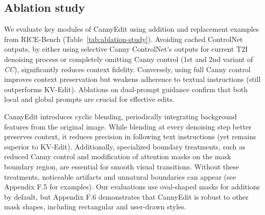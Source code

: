 \documentclass{article}
\begin{document}

\vspace{-1mm}
\subsection{Ablation study}

\vspace{-1mm}

We evaluate key modules of CannyEdit using addition and replacement examples from RICE-Bench (Table~\ref{tab:ablation-study}). Avoiding cached ControlNet outputs, by either using selective Canny ControlNet's outputs for current T2I denoising process or completely omitting Canny control (1st and 2nd variant of \emph{CC}), significantly reduces context fidelity. Conversely, using full Canny control improves context preservation but weakens adherence to textual instructions (still outperforms KV-Edit). Ablations on dual-prompt guidance confirm that both local and global prompts are crucial for effective edits.

CannyEdit introduces cyclic blending, periodically integrating background features from the original image. While blending at every denoising step better preserves context, it reduces precision in following text instructions (yet remains superior to KV-Edit). Additionally, specialized boundary treatments, such as reduced Canny control and modification of attention masks on the mask boundary region, are essential for smooth visual transitions. Without these treatments, noticeable artifacts and unnatural boundaries can appear (see Appendix F.5 for examples). Our evaluations use oval-shaped masks for additions by default, but Appendix F.6 demonstrates that CannyEdit is robust to other mask shapes, including rectangular and user-drawn styles.
\end{document}
